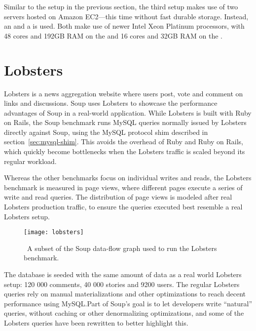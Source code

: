 Similar to the setup in the previous section, the third setup makes use of two
servers hosted on Amazon EC2---this time without fast durable storage. Instead,
an  and a  is used. Both make use of newer
Intel Xeon Platinum processors, with 48 cores and 192GB RAM on the  and
16 cores and 32GB RAM on the .

\section{Lobsters}


Lobsters is a news aggregation website where users post,
vote and comment on links and discussions. Soup uses Lobsters to showcase the
performance advantages of Soup in a real-world application. While Lobsters is
built with Ruby on Rails, the Soup benchmark runs MySQL queries normally issued
by Lobsters directly against Soup, using the MySQL protocol shim described in
section~\ref{sec:mysql-shim}. This avoids the overhead of Ruby and Ruby on
Rails, which quickly become bottlenecks when the Lobsters traffic is scaled
beyond its regular workload.

Whereas the other benchmarks focus on individual writes and reads, the Lobsters
benchmark is measured in page views, where different pages execute a series of
write and read queries. The distribution of page views is modeled after real
Lobsters production traffic, to ensure the queries executed best resemble a real
Lobsters setup.

\begin{figure}[H]
  \centering
  \texttt{[image: lobsters]}
  \caption{\
    A subset of the Soup data-flow graph used to run the Lobsters benchmark.
  }\label{fig:lobsters-graph}
\end{figure}

The database is seeded with the same amount of data as a real world Lobsters
setup: 120 000 comments, 40 000 stories and 9200 users. The regular Lobsters
queries rely on manual materializations and other optimizations to reach decent
performance using MySQL.\@ Part of Soup's goal is to let developers write
``natural'' queries, without caching or other denormalizing optimizations, and
some of the Lobsters queries have been rewritten to better highlight this.

